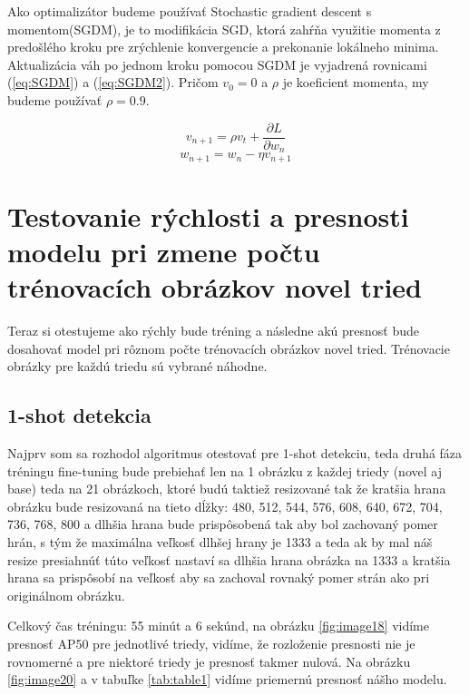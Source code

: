 Ako optimalizátor budeme používať Stochastic gradient descent s momentom(SGDM), je to modifikácia SGD, ktorá zahŕňa využitie momenta z predošlého kroku pre zrýchlenie konvergencie a prekonanie lokálneho minima. Aktualizácia váh po jednom kroku pomocou SGDM je vyjadrená rovnicami (\ref{eq:SGDM}) a (\ref{eq:SGDM2}). Pričom $v_0 = 0$ a $\rho$ je koeficient momenta, my budeme používať $\rho = 0.9$. 

\begin{equation}
v_{n+1} = \rho v_t + \frac{\partial L}{\partial w_n}
\label{eq:SGDM}
\end{equation}
\begin{equation}
w_{n+1} = w_n - \eta v_{n+1} 
\label{eq:SGDM2}
\end{equation}

\section{Testovanie rýchlosti a presnosti modelu pri zmene počtu trénovacích obrázkov novel tried}

Teraz si otestujeme ako rýchly bude tréning a následne akú presnosť bude dosahovať model pri rôznom počte trénovacích obrázkov novel tried. Trénovacie obrázky pre každú triedu sú vybrané náhodne. 

\subsection{1-shot detekcia}

Najprv som sa rozhodol algoritmus otestovať pre 1-shot detekciu, teda druhá fáza tréningu fine-tuning bude prebiehať len na 1 obrázku z každej triedy (novel aj base) teda na 21 obrázkoch, ktoré budú taktiež resizované tak že kratšia hrana obrázku bude resizovaná na tieto dĺžky: 480, 512, 544, 576, 608, 640, 672, 704, 736, 768, 800 a dlhšia hrana bude prispôsobená tak aby bol zachovaný pomer hrán, s tým že maximálna veľkosť dlhšej hrany je 1333 a teda ak by mal náš resize presiahnúť túto veľkosť nastaví sa dlhšia hrana obrázka na 1333 a kratšia hrana sa prispôsobí na veľkosť aby sa zachoval rovnaký pomer strán ako pri originálnom obrázku. 

Celkový čas tréningu: 55 minút a 6 sekúnd, na obrázku \ref{fig:image18} vidíme presnosť AP50 pre jednotlivé triedy, vidíme, že rozloženie presnosti nie je rovnomerné a pre niektoré triedy je presnosť takmer nulová. Na obrázku \ref{fig:image20} a v tabuľke \ref{tab:table1} vidíme priemernú presnosť nášho modelu.

